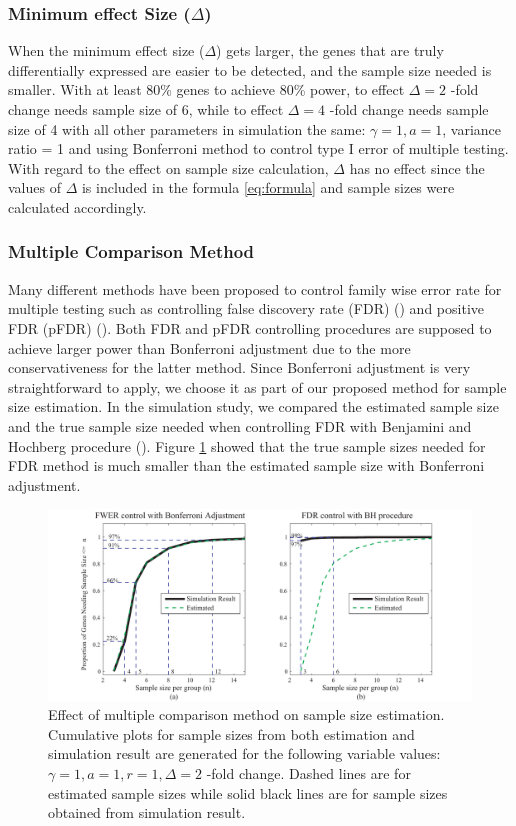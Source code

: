 \documentclass{bioinfo}
\begin{document}
\subsubsection{Minimum effect Size ($\Delta$)}

When the minimum effect size ($\Delta$) gets larger, the genes
that are truly differentially expressed are easier to be detected,
and the sample size needed is smaller.  With at least 80\% genes
to achieve 80\% power, to effect $\Delta = 2$ -fold change needs
sample size of 6, while to effect $\Delta = 4$ -fold change needs
sample size of 4 with all other parameters in simulation the same:
$\gamma = 1, a = 1$, variance ratio = 1 and using Bonferroni
method to control type I error of multiple testing. With regard to
the effect on sample size calculation, $\Delta$ has no effect
since the values of $\Delta$ is included in the formula
\ref{eq:formula} and sample sizes were calculated accordingly.

\subsubsection{Multiple Comparison Method}

Many different methods have been proposed to control family wise
error rate for multiple testing such as controlling false
discovery rate (FDR) (\citealp{Benjamini95}) and positive FDR
(pFDR) (\citealp{Storey02}). Both FDR and pFDR controlling
procedures are supposed to achieve larger power than Bonferroni
adjustment due to the more conservativeness for the latter method.
Since Bonferroni adjustment is very straightforward to apply, we
choose it as part of our proposed method for sample size
estimation. In the simulation study, we compared the estimated
sample size and the true sample size needed when controlling FDR
with Benjamini and Hochberg procedure (\citealp{Benjamini95}).
Figure \ref{fig:ResMtd} showed that the true sample sizes needed
for FDR method is much smaller than the estimated sample size with
Bonferroni adjustment.

\begin{figure}[h]
  \centerline{\includegraphics*[width=3.5 in]{ResMtd.pdf}}
  \caption[Effect of multiple comparison method on sample size estimation]
  {Effect of multiple comparison method on sample size estimation.
    Cumulative plots for sample sizes from both estimation and
    simulation result are generated for the following variable values: $\gamma = 1, a = 1, r = 1,
    \Delta = 2$ -fold change. Dashed lines are for estimated sample sizes
    while solid black lines are for sample sizes obtained from simulation result.}
  \label{fig:ResMtd}
\end{figure}
\end{document}
